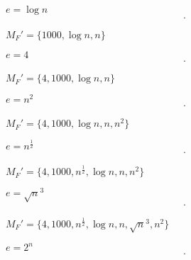 \documentclass{article}
\begin{document}
\vspace{0.6cm}
$e = \operatorname{log} n$
\begin{equation*}
	\begin{array}{llll}
		.
	\end{array}
\end{equation*}
\begin{flushright}
	$M_F' = \{1000,\operatorname{log}n,n\}$
\end{flushright}
\vspace{0.6cm}
$e = 4$
\begin{equation*}
	\begin{array}{llll}
		.
	\end{array}
\end{equation*}
\begin{flushright}
	$M_F' = \{4,1000,\operatorname{log}n,n\}$
\end{flushright}
\vspace{0.6cm}
$e = n^2$
\begin{equation*}
	\begin{array}{llll}
		.
	\end{array}
\end{equation*}
\begin{flushright}
	$M_F' = \{4,1000,\operatorname{log}n,n,n^2\}$
\end{flushright}
\vspace{0.6cm}
$e = n^{\frac{1}{2}}$
\begin{equation*}
	\begin{array}{llll}
		.
	\end{array}
\end{equation*}
\begin{flushright}
	$M_F' = \{4,1000,n^{\frac{1}{2}},\operatorname{log}n,n,n^2\}$
\end{flushright}
\vspace{0.6cm}
$e = \sqrt{n}^3$
\begin{equation*}
	\begin{array}{llll}
		.
	\end{array}
\end{equation*}
\begin{flushright}
	$M_F' = \{4,1000,n^{\frac{1}{2}},\operatorname{log}n,n,\sqrt{n}^3,n^2\}$
\end{flushright}
\vspace{0.6cm}
$e = 2^n$
\begin{equation*}
	\begin{array}{llll}
		.
	\end{array}
\end{equation*}
\end{document}
